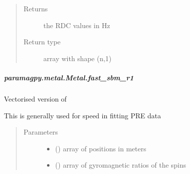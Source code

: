\documentclass[a4paper,10pt,english,openany,oneside]{sphinxmanual}
\begin{document}
\begin{fulllineitems}
\begin{fulllineitems}
\begin{fulllineitems}
\begin{quote}
\begin{description}
\item[{Returns}] \leavevmode
\sphinxAtStartPar
{} \textendash{} the RDC values in Hz

\item[{Return type}] \leavevmode
\sphinxAtStartPar
array with shape (n,1)

\end{description}\end{quote}

\end{fulllineitems}



\subparagraph{paramagpy.metal.Metal.fast\_sbm\_r1}
\label{\detokenize{reference/generated/paramagpy.metal.Metal.fast_sbm_r1:paramagpy-metal-metal-fast-sbm-r1}}\label{\detokenize{reference/generated/paramagpy.metal.Metal.fast_sbm_r1::doc}}

\begin{fulllineitems}
\label{\detokenize{reference/generated/paramagpy.metal.Metal.fast_sbm_r1:paramagpy.metal.Metal.fast_sbm_r1}}
\sphinxAtStartPar
Vectorised version of {\hyperref[\detokenize{reference/generated/paramagpy.metal.Metal.sbm_r1:paramagpy.metal.Metal.sbm_r1}]{}}

\sphinxAtStartPar
This is generally used for speed in fitting PRE data
\begin{quote}\begin{description}
\item[{Parameters}] \leavevmode\begin{itemize}
\item {} 
\sphinxAtStartPar
{} (\sphinxstyleliteralemphasis{\sphinxupquote{ (}}\sphinxstyleliteralemphasis{\sphinxupquote{,}}\sphinxstyleliteralemphasis{\sphinxupquote{)}}) \textendash{} array of positions in meters

\item {} 
\sphinxAtStartPar
{} (\sphinxstyleliteralemphasis{\sphinxupquote{ (}}\sphinxstyleliteralemphasis{\sphinxupquote{,}}\sphinxstyleliteralemphasis{\sphinxupquote{)}}) \textendash{} array of gyromagnetic ratios of the spins


\end{itemize}
\end{description}
\end{quote}
\end{fulllineitems}
\end{fulllineitems}
\end{fulllineitems}
\end{document}
